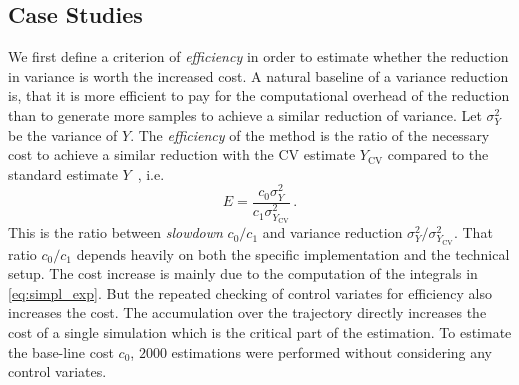 
\subsection{Case Studies}\label{sec:cv:study}
We first define a criterion of \emph{efficiency} in order to estimate
whether the reduction in variance is worth the increased cost.
A natural baseline of a variance reduction is, that it is more efficient to pay for
the computational overhead of the reduction than to generate more samples to achieve a similar
reduction of variance.
Let $\sigma_Y^2$ be the variance of $Y$.
The \emph{efficiency} of the method is the ratio of the necessary
cost to achieve a similar reduction with the \ac{CV} estimate $Y_{\text{CV}}$ compared to
the standard estimate $Y$~\parencite{l1994efficiency}, i.e.
\begin{equation}\label{eq:efficiency}
E=\frac{c_0\sigma_Y^2}{c_1\sigma^2_{Y_{\text{CV}}}}\,.
\end{equation}
This is the ratio between \emph{slowdown} $c_0/c_1$ and variance reduction $\sigma_{Y}^2 / \sigma_{Y_{\text{CV}}}^2$.
That ratio $c_0/c_1$ depends heavily on both the specific implementation and the technical setup.
The cost increase is  mainly due to the computation of the integrals in \eqref{eq:simpl_exp}.
But the repeated checking of control  variates for efficiency also increases the cost.
The accumulation over the trajectory directly increases the cost of a single simulation
which is the critical part of the estimation.
To estimate the base-line cost $c_0$, $2000$ estimations were performed without
considering any control variates.

